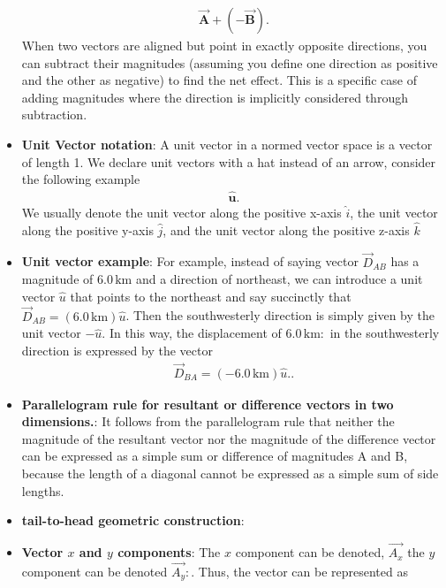 \documentclass{report}
\begin{document}
\begin{itemize}
            \begin{align*}
                \vec{\textbf{A}} + (-\vec{\textbf{B}})
            .\end{align*}
            \bigbreak \noindent 
            When two vectors are aligned but point in exactly opposite directions, you can subtract their magnitudes (assuming you define one direction as positive and the other as negative) to find the net effect. This is a specific case of adding magnitudes where the direction is implicitly considered through subtraction.
        \item \textbf{Unit Vector notation}:  A unit vector in a normed vector space is a vector of length 1. We declare unit vectors with a hat instead of an arrow, consider the following example
            \begin{align*}
                \hat{\textbf{u}}
            .\end{align*}
            We usually denote the unit vector along the positive x-axis $\hat{i}$, the unit vector along the positive y-axis $\hat{j}$, and the unit vector along the positive z-axis $\hat{k}$
        \item \textbf{Unit vector example}: For example, instead of saying vector $\vec{D}_{AB}$ has a magnitude of $6.0\,\text{km}$ and a direction of northeast, we can introduce a unit vector $\hat{u}$ that points to the northeast and say succinctly that $\vec{D}_{AB} = (6.0\,\text{km})\hat{u}$. Then the southwesterly direction is simply given by the unit vector $-\hat{u}$. In this way, the displacement of $6.0\,\text{km}:$ in the southwesterly direction is expressed by the vector
            \begin{align*}
                    \vec{D}_{BA} = (-6.0\,\text{km})\hat{u}.
            .\end{align*}
        \item \textbf{Parallelogram rule for resultant or difference vectors in two dimensions.}:
            \bigbreak \noindent 
            \bigbreak \noindent 
            It follows from the parallelogram rule that neither the magnitude of the resultant vector nor the magnitude of the difference vector can be expressed as a simple sum or difference of magnitudes A and B, because the length of a diagonal cannot be expressed as a simple sum of side lengths.
        \item \textbf{tail-to-head geometric construction}:
            \bigbreak \noindent 
        \item \textbf{Vector $x$ and $y$ components}: The $x$ component can be denoted, $\vec{A_{x}}$ the $y$ component can be denoted $\vec{A_{y}}:$. Thus, the vector can be represented as

\end{itemize}
\end{document}
